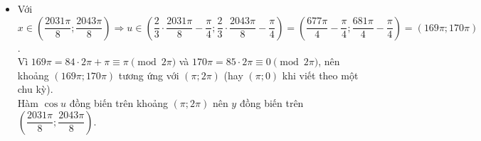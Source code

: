 \begin{vd}
{\begin{enumerate}[a)]
\begin{itemize}
				      \item Với $x \in \left(\dfrac{2031\pi}{8};\dfrac{2043\pi}{8}\right) \Rightarrow u \in \left(\dfrac{2}{3} \cdot \dfrac{2031\pi}{8}-\dfrac{\pi}{4}; \dfrac{2}{3} \cdot \dfrac{2043\pi}{8}-\dfrac{\pi}{4}\right) = \left(\dfrac{677\pi}{4}-\dfrac{\pi}{4}; \dfrac{681\pi}{4}-\dfrac{\pi}{4}\right) = (169\pi; 170\pi)$.\\
				            Vì $169\pi = 84 \cdot 2\pi + \pi \equiv \pi \pmod{2\pi}$ và $170\pi = 85 \cdot 2\pi \equiv 0 \pmod{2\pi}$, nên khoảng $(169\pi; 170\pi)$ tương ứng với $(\pi; 2\pi)$ (hay $(\pi; 0)$ khi viết theo một chu kỳ).\\
				            Hàm $\cos u$ đồng biến trên khoảng $(\pi; 2\pi)$ nên $y$ đồng biến trên $\left(\dfrac{2031\pi}{8};\dfrac{2043\pi}{8}\right)$.
			      \end{itemize}
		\end{enumerate}
	}
\end{vd}

